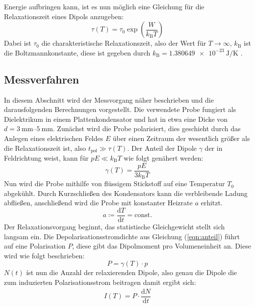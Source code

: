 Energie aufbringen kann, ist es nun möglich eine Gleichung für die Relaxationszeit eines Dipols anzugeben:
\begin{equation}
  \label{eqn:relax}
  \tau(T)=\tau_\mathrm{0}\exp\left(\dfrac{W}{k_\mathrm{B}T}\right)
\end{equation}
Dabei ist $\tau_\mathrm{0}$ die charakteristische Relaxationszeit, also der Wert für $T\rightarrow\infty$, $k_\mathrm{B}$ ist die Boltzmannkonstante, diese ist gegeben durch $k_\mathrm{B}=\SI{1.380649e-23}{\joule\per\kelvin}$ \cite{Anleitung7}.
\subsection{Messverfahren}
\label{sec:messv}
In diesem Abschnitt wird der Messvorgang näher beschrieben und die darausfolgenden Berechnungen vorgestellt. Die verwendete Probe fungiert als Dielektrikum in einem Plattenkondensator und hat in etwa eine Dicke von $d=\SIrange{3}{5}{\milli\meter}$. Zunächst wird die Probe polarisiert, dies geschieht durch das Anlegen eines elektrischen Feldes $E$ über einen Zeitraum der wesentlich größer als die Relaxationszeit ist, also $t_\mathrm{pol}\gg\tau(T)$.
Der Anteil der Dipole $\gamma$ der in Feldrichtung weist, kann für $pE\ll k_\mathrm{B}T$ wie folgt genähert werden:
\begin{equation}
  \label{eqn:anteil}
  \gamma(T)=\dfrac{pE}{3k_\mathrm{B}T}
\end{equation}
Nun wird die Probe mithilfe von flüssigem Stickstoff auf eine Temperatur $T_\mathrm{0}$ abgekühlt. Durch Kurzschließen des Kondensators kann die verbleibende Ladung abfließen,
anschließend wird die Probe mit konstanter Heizrate $a$ erhitzt.
\begin{equation}
  a\coloneqq\dfrac{\mathrm{d} T}{\mathrm{d} t}= \mathrm{const.}
\end{equation}
Der Relaxationsvorgang beginnt, das statistische Gleichgewicht stellt sich langsam ein. Die Depolarisationsstromdichte aus Gleichung (\ref{eqn:anteil}) führt auf eine Polarisation $P$, diese gibt das Dipolmoment pro Volumeneinheit an.
Diese wird wie folgt beschrieben:
\begin{equation}
  \label{eqn:pola}
  P=\gamma(T)\cdot p
\end{equation}
$N(t)$ íst nun die Anzahl der relaxierenden Dipole, also genau die Dipole die zum induzierten Polarisationsstrom beitragen damit ergibt sich:
\begin{align*}
  I(T)=P\cdot\dfrac{\mathrm{d} N}{\mathrm{d} t}
\end{align*}
